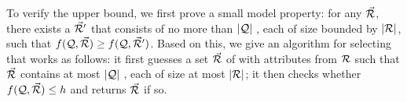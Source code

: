 \vspace{-0.4ex}

\begin{proofS}
To verify the upper bound, we first prove a small model
property: for any \bds $\vec{{\mathcal R}}$, there exists a \bds $\vec{{\mathcal R}}'$
that consists of no more than $|{\mathcal Q}|$ \bss, each of size
bounded by $|{\mathcal R}|$, such that $f(\mathcal Q, \vec{{\mathcal R}}) \geq f(\mathcal Q,
\vec{{\mathcal R}}')$. Based on this, we give an \NP algorithm for selecting
  \bds that works as follows:
it first guesses a set $\vec{{\mathcal R}}$ of \bss with attributes from
${\mathcal R}$ such that $\vec{{\mathcal R}}$ contains at most $|{\mathcal Q}|$ \bss,
each of size at most $|{\mathcal R}|$;
it then checks whether $f(\mathcal Q, \vec{{\mathcal R}})\leq h$ and returns
$\vec{{\mathcal R}}$ if so.
%
\end{proofS}


